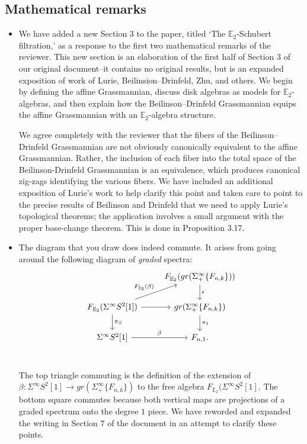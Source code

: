 \documentclass[reqno, oneside]{amsart}
\theoremstyle{definition}
\theoremstyle{plain}
\DeclareMathOperator{\E}{\mathbb{E}}
\begin{document}
\subsection{Mathematical remarks}



\begin{itemize}

\item We have added a new Section $3$ to the paper, titled `The $\mathbb{E}_2$-Schubert filtration,' as a response to the first two mathematical remarks of the reviewer.  This new section is an elaboration of the first half of Section $3$ of our original document--it contains no original results, but is an expanded exposition of work of Lurie, Beilinsion--Drinfeld, Zhu, and others.  We begin by defining the affine Grassmannian, discuss disk algebras as models for $\mathbb{E}_2$-algebras, and then explain how the Beilinson--Drinfeld Grassmannian equips the affine Grassmannian with an $\mathbb{E}_2$-algebra structure.


We agree completely with the reviewer that the fibers of the Beilinson--Drinfeld Grassmannian are not obviously canonically equivalent to the affine Grassmannian.  Rather, the inclusion of each fiber into the total space of the Beilinson-Drinfeld Grassmannian is an equivalence, which produces canonical zig-zags identifying the various fibers.  We have included an additional exposition of Lurie's work to help clarify this point and taken care to point to the precise results of Beilinson and Drinfeld that we need to apply Lurie's topological theorems; the application involves a small argument with the proper base-change theorem.  This is done in Proposition 3.17.  

\item The diagram that you draw does indeed commute.  It arises from going around the following diagram of \emph{graded} spectra:
$$
\begin{tikzcd}
 & F_{\E_2}( gr(\Sigma^{\infty}_+\{F_{n,k}\}) )\arrow[d,"\epsilon"] \\
F_{\E_2}(\Sigma^{\infty}S^2[1]) \arrow[ru, "F_{\E_2}(\beta)"] \arrow[r]\arrow[d,"\pi_S"] & gr(\Sigma^{\infty}_+ \{ F_{n,k}\} ) \arrow[d,"\pi_1"] \\
\Sigma^{\infty} S^2[1] \arrow[r,"\beta"]& F_{n,1}.\\
\end{tikzcd}
$$

The top triangle commuting is the definition of the extension of $\beta: \Sigma^{\infty}S^2[1] \to gr(\Sigma^{\infty}_+ \{F_{n,k} \} )$ to the free algebra $F_{\E_2} (\Sigma^{\infty} S^2[1]$.  The bottom square commutes because both vertical maps are projections of a graded spectrum onto the degree $1$ piece.  We have reworded and expanded the writing in Section $7$ of the document in an attempt to clarify these points.


\end{itemize}
\end{document}
